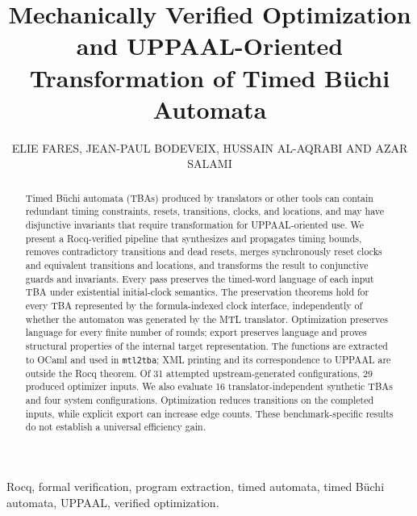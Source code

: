 \documentclass{ieeeaccess}
\begin{document}
\history{}
\doi{}

\title{Mechanically Verified Optimization and UPPAAL-Oriented Transformation of Timed B\"uchi Automata}
\author{\uppercase{Elie Fares},
\uppercase{Jean-Paul Bodeveix},
\uppercase{Hussain Al-Aqrabi} AND
\uppercase{Azar Salami}}
\address[1]{Higher Colleges of Technology\\Sharjah, United Arab Emirates\\(e-mail: efares@hct.ac.ae, halaqrabi@hct.ac.ae, asalami@hct.ac.ae)}
\address[2]{IRIT, UPS, Universit\'e de Toulouse, France (e-mail: bodeveix@irit.fr)}

\begin{abstract}
Timed B\"uchi automata (TBAs) produced by translators or other tools can contain redundant timing constraints, resets, transitions, clocks, and locations, and may have disjunctive invariants that require transformation for UPPAAL-oriented use. We present a Rocq-verified pipeline that synthesizes and propagates timing bounds, removes contradictory transitions and dead resets, merges synchronously reset clocks and equivalent transitions and locations, and transforms the result to conjunctive guards and invariants. Every pass preserves the timed-word language of each input TBA under existential initial-clock semantics. The preservation theorems hold for every TBA represented by the formula-indexed clock interface, independently of whether the automaton was generated by the MTL translator. Optimization preserves language for every finite number of rounds; export preserves language and proves structural properties of the internal target representation. The functions are extracted to OCaml and used in \texttt{mtl2tba}; XML printing and its correspondence to UPPAAL are outside the Rocq theorem. Of 31 attempted upstream-generated configurations, 29 produced optimizer inputs. We also evaluate 16 translator-independent synthetic TBAs and four system configurations. Optimization reduces transitions on the completed inputs, while explicit export can increase edge counts. These benchmark-specific results do not establish a universal efficiency gain.
\end{abstract}
\begin{keywords}
Rocq, formal verification, program extraction, timed automata, timed B\"uchi automata, UPPAAL, verified optimization.
\end{keywords}
\titlepgskip=-15pt
\maketitle
\end{document}
